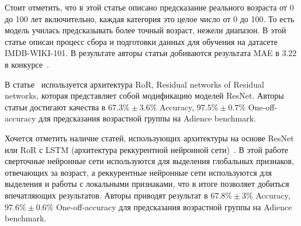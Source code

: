 Стоит отметить, что в этой статье описано предсказание реального возраста от 0 до 100 лет включительно, каждая категория это целое число от 0 до 100.
То есть модель училась предсказывать более точный возраст, нежели диапазон.
В этой статье описан процесс сбора и подготовки данных для обучения на датасете IMDB-WIKI-101\cite{imdb_db}.
В результате авторы статьи добиваются результата MAE в $3.22$ в конкурсе~\cite{lap}.
\par В статье~\cite{ror} используется архитектура RoR, Residual networks of Residual networks,
которая представляет собой модификацию моделей ResNet.
Авторы статьи достигают качества в $67.3\% \pm 3.6 \%$ Accuracy,
$97.5\% \pm 0.7\%$ One-off-accuracy для предсказания возрастной группы на Adience benchmark.
\par Хочется отметить наличие статей, использующих архитектуры на основе ResNet или RoR с LSTM (архитектура реккурентной нейронной сети)~\cite{lstm}.
В этой работе сверточные нейронные сети используются для выделения глобальных признаков, отвечающих за возраст,
а реккурентные нейронные сети используются для выделения и работы с локальными признаками, что в итоге позволяет добиться впечатляющих результатов.
Авторы приводят результат в $67.8\% \pm 3 \%$ Accuracy,
$97.6\% \pm 0.6\%$ One-off-accuracy для предсказания возрастной группы на Adience benchmark.
\newpage